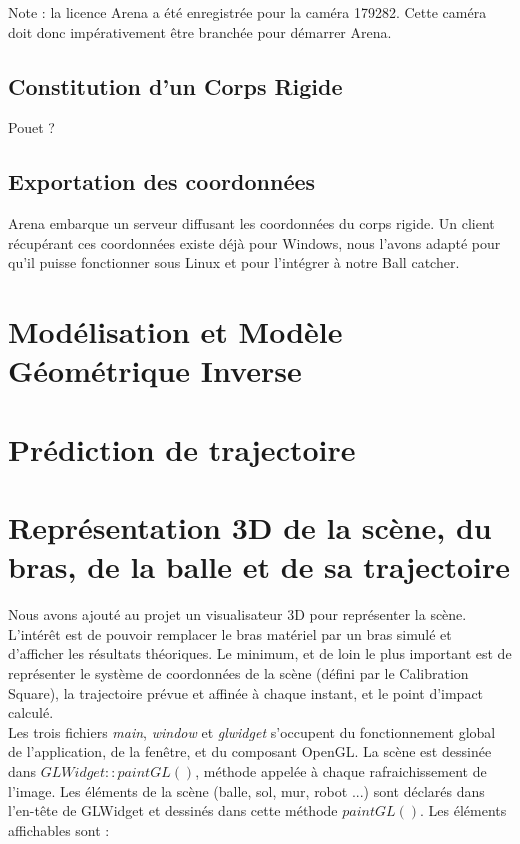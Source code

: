 \documentclass{article}[11pt]
\begin{document}
Note : la licence Arena a été enregistrée pour la caméra 179282. Cette caméra doit donc impérativement être branchée pour démarrer Arena.

\subsection{Constitution d'un Corps Rigide}

Pouet ?

\subsection{Exportation des coordonnées}

Arena embarque un serveur diffusant les coordonnées du corps rigide. Un client récupérant ces coordonnées existe déjà pour Windows, nous l'avons adapté pour qu'il puisse fonctionner sous Linux et pour l'intégrer à notre Ball catcher. 

\section{Modélisation et Modèle Géométrique Inverse}


\section{Prédiction de trajectoire}


\section{Représentation 3D de la scène, du bras, de la balle et de sa trajectoire}

Nous avons ajouté au projet un visualisateur 3D pour représenter la scène. L'intérêt est de pouvoir remplacer le bras matériel par un bras simulé et d'afficher les résultats théoriques. Le minimum, et de loin le plus important est de représenter le système de coordonnées de la scène (défini par le Calibration Square), la trajectoire prévue et affinée à chaque instant, et le point d'impact calculé. \\

Les trois fichiers \textit{main}, \textit{window} et \textit{glwidget} s'occupent du fonctionnement global de l'application, de la fenêtre, et du composant OpenGL. La scène est dessinée dans $GLWidget::paintGL()$, méthode appelée à chaque rafraichissement de l'image. Les éléments de la scène (balle, sol, mur, robot ...) sont déclarés dans l'en-tête de GLWidget et dessinés dans cette méthode $paintGL()$. Les éléments affichables sont :\\
\end{document}
